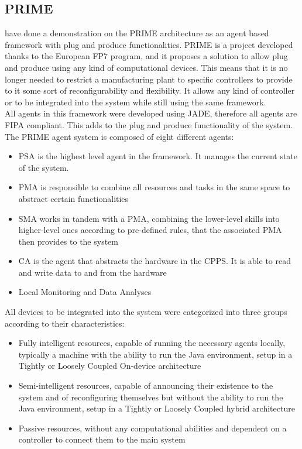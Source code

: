 \subsection{PRIME}

\citeauthor{PRIME_plug_and_produce} \cite{PRIME_plug_and_produce} have done a demonstration on the PRIME architecture as an agent based framework with plug and produce functionalities. PRIME is a project developed thanks to the European FP7 program, and it proposes a solution to allow plug and produce using any kind of computational devices. This means that it is no longer needed to restrict a manufacturing plant to specific controllers to provide to it some sort of reconfigurability and flexibility. It allows any kind of controller or to be integrated into the system while still using the same framework.\\

All agents in this framework were developed using \gls{JADE}, therefore all agents are \gls{FIPA} compliant. This adds to the plug and produce functionality of the system. The PRIME agent system is composed of eight different agents:
\begin{itemize}
	\item \gls{PSA} is the highest level agent in the framework. It manages the current state of the system.
	\item \gls{PMA} is responsible to combine all resources and tasks in the same space to abstract certain functionalities
	\item \gls{SMA} works in tandem with a \gls{PMA}, combining the lower-level skills into higher-level ones according to pre-defined rules, that the associated \gls{PMA} then provides to the system
	\item \gls{CA} is the agent that abstracts the hardware in the \gls{CPPS}. It is able to read and write data to and from the hardware
	\item Local Monitoring and Data Analyses
\end{itemize}

All devices to be integrated into the system were categorized into three groups according to their characteristics:
\begin{itemize}
	\item Fully intelligent resources, capable of running the necessary agents locally, typically a machine with the ability to run the Java environment, setup in a Tightly or Loosely Coupled On-device architecture
	\item Semi-intelligent resources, capable of announcing their existence to the system and of reconfiguring themselves but without the ability to run the Java environment, setup in a Tightly or Loosely Coupled hybrid architecture
	\item Passive resources, without any computational abilities and dependent on a controller to connect them to the main system  
\end{itemize}

